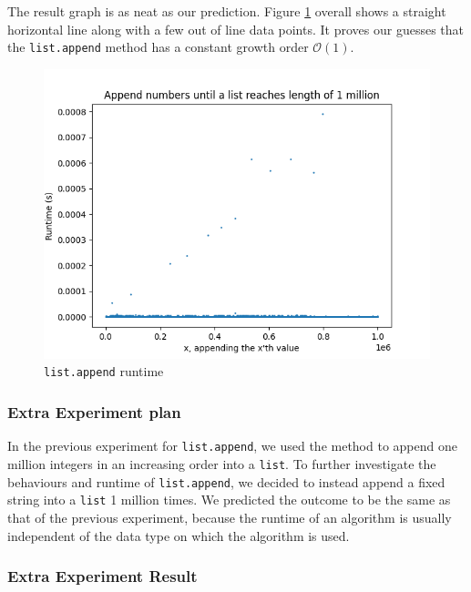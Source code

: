 \documentclass[titlepage, 12pt]{article}
\begin{document}
The result graph is as neat as our prediction. Figure \ref{fig:append} overall
shows a straight horizontal line along with a few out of line data points. It
proves our guesses that the \texttt{list.append} method has a constant growth
order \( \mathcal{O}(1) \).
\begin{figure}[H]
  \includegraphics[width=0.8\linewidth]{append.png}
  \centering
  \caption{\texttt{list.append} runtime}
  \label{fig:append}
\end{figure}

\subsubsection{Extra Experiment plan}

In the previous experiment for \texttt{list.append}, we used the method to
append one million integers in an increasing order into a \texttt{list}. To
further investigate the behaviours and runtime of \texttt{list.append}, we
decided to instead append a fixed string into a \texttt{list} 1 million times.
We predicted the outcome to be the same as that of the previous experiment,
because the runtime of an algorithm is usually independent of the data type
on which the algorithm is used.

\subsubsection{Extra Experiment Result}
\end{document}
